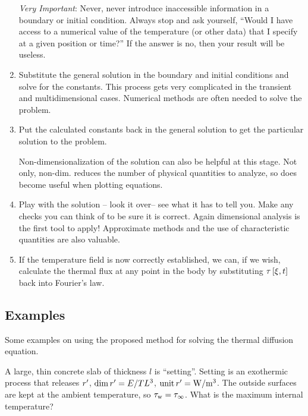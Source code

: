 \begin{enumerate}
\begin{warning}
\emph{Very Important}: Never, never introduce inaccessible information in a boundary or initial condition. Always stop and ask yourself, ``Would I have access to a numerical value of the temperature (or other data) that I specify at a given position or time?'' If the answer is no, then your result will be useless.
\end{warning}

\item Substitute the general solution in the boundary and initial conditions and solve for the constants. This process gets very complicated in the transient and multidimensional cases. Numerical methods are often needed to solve the problem.
%
\item Put the calculated constants back in the general solution to get the particular solution to the problem.

\begin{note}
Non-dimensionalization of the solution can also be helpful at this stage. Not only, non-dim. reduces the number of physical quantities to analyze, so does become useful when plotting equations.
\end{note}

\item Play with the solution -- look it over-- see what it has to tell you. Make any checks you can think of to be sure it is correct. Again dimensional analysis is the first tool to apply! Approximate methods and the use of characteristic quantities are also valuable.
%
\item If the temperature field is now correctly established, we can, if we wish, calculate the thermal flux at any point in the body by substituting $\temp\vat{\pos, t}$ back into Fourier's law.
%
\end{enumerate}


\subsection{Examples}
Some examples on using the proposed method for solving the thermal diffusion equation.

\begin{example}
A large, thin concrete slab of thickness $l$ is ``setting''. Setting is an exothermic process that releases $\flow\chthen$, $\dim\flow\chthen = E/TL^3$, $\unit\flow\chthen = \si{W/m^3}$. The outside surfaces are kept at the ambient temperature, so $\temp\txt w = \temp_\infty$. What is the maximum internal temperature?
\end{example}

